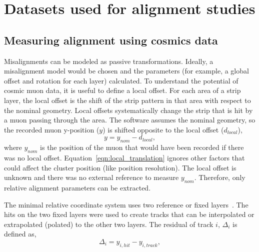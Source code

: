 
\chapter{Datasets used for alignment studies}

\section{Measuring alignment using cosmics data}

Misalignments can be modeled as passive transformations. Ideally, a misalignment model would be chosen and the parameters (for example, a global offset and rotation for each layer) calculated. To understand the potential of cosmic muon data, it is useful to define a local offset. For each area of a strip layer, the local offset is the shift of the strip pattern in that area with respect to the nominal geometry.  Local offsets systematically change the strip that is hit by a muon passing through the area. The  software assumes the nominal geometry, so the recorded muon y-position ($y$) is shifted opposite to the local offset ($d_{local}$),
\begin{equation}
    y = y_{nom} - d_{local},
    \label{eqn:local_translation}
\end{equation}
where $y_{nom}$ is the position of the muon that would have been recorded if there was no local offset. Equation~\ref{eqn:local_translation} ignores other factors that could affect the cluster position (like position resolution). The local offset is unknown and there was no external reference to measure $y_{nom}$. Therefore, only relative alignment parameters can be extracted. 

The minimal relative coordinate system uses two reference or fixed layers~\cite{lefebvre_thesis}. The hits on the two fixed layers were used to create tracks that can be interpolated or extrapolated (polated) to the other two layers. The residual of track $i$, $\Delta_i$ is defined as,
\begin{equation}
    \Delta_i = y_{i,hit} - y_{i,track},
    \label{eqn:residual}
\end{equation}

